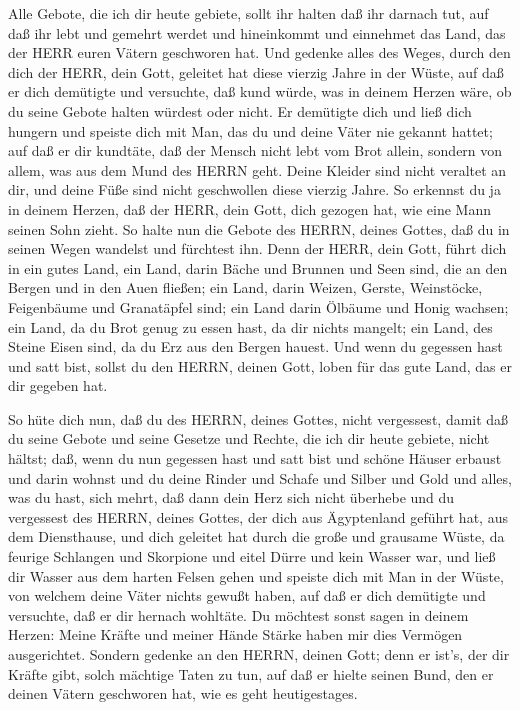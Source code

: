  Alle Gebote, die ich dir heute gebiete, sollt ihr halten
daß ihr darnach tut, auf daß ihr lebt und gemehrt werdet und hineinkommt
und einnehmet das Land, das der HERR euren Vätern geschworen hat.
 Und gedenke alles des Weges, durch den dich der HERR, dein
Gott, geleitet hat diese vierzig Jahre in der Wüste, auf daß er dich
demütigte und versuchte, daß kund würde, was in deinem Herzen wäre, ob
du seine Gebote halten würdest oder nicht.  Er demütigte
dich und ließ dich hungern und speiste dich mit Man, das du und deine
Väter nie gekannt hattet; auf daß er dir kundtäte, daß der Mensch nicht
lebt vom Brot allein, sondern von allem, was aus dem Mund des HERRN
geht.  Deine Kleider sind nicht veraltet an dir, und deine
Füße sind nicht geschwollen diese vierzig Jahre.  So
erkennst du ja in deinem Herzen, daß der HERR, dein Gott, dich gezogen
hat, wie eine Mann seinen Sohn zieht.  So halte nun die
Gebote des HERRN, deines Gottes, daß du in seinen Wegen wandelst und
fürchtest ihn.  Denn der HERR, dein Gott, führt dich in ein
gutes Land, ein Land, darin Bäche und Brunnen und Seen sind, die an den
Bergen und in den Auen fließen;  ein Land, darin Weizen,
Gerste, Weinstöcke, Feigenbäume und Granatäpfel sind; ein Land darin
Ölbäume und Honig wachsen;  ein Land, da du Brot genug zu
essen hast, da dir nichts mangelt; ein Land, des Steine Eisen sind, da
du Erz aus den Bergen hauest.  Und wenn du gegessen hast
und satt bist, sollst du den HERRN, deinen Gott, loben für das gute
Land, das er dir gegeben hat.

 So hüte dich nun, daß du des HERRN, deines Gottes, nicht
vergessest, damit daß du seine Gebote und seine Gesetze und Rechte, die
ich dir heute gebiete, nicht hältst;  daß, wenn du nun
gegessen hast und satt bist und schöne Häuser erbaust und darin wohnst
 und du deine Rinder und Schafe und Silber und Gold und
alles, was du hast, sich mehrt,  daß dann dein Herz sich
nicht überhebe und du vergessest des HERRN, deines Gottes, der dich aus
Ägyptenland geführt hat, aus dem Diensthause,  und dich
geleitet hat durch die große und grausame Wüste, da feurige Schlangen
und Skorpione und eitel Dürre und kein Wasser war, und ließ dir Wasser
aus dem harten Felsen gehen  und speiste dich mit Man in
der Wüste, von welchem deine Väter nichts gewußt haben, auf daß er dich
demütigte und versuchte, daß er dir hernach wohltäte.  Du
möchtest sonst sagen in deinem Herzen: Meine Kräfte und meiner Hände
Stärke haben mir dies Vermögen ausgerichtet.  Sondern
gedenke an den HERRN, deinen Gott; denn er ist's, der dir Kräfte gibt,
solch mächtige Taten zu tun, auf daß er hielte seinen Bund, den er
deinen Vätern geschworen hat, wie es geht heutigestages.

